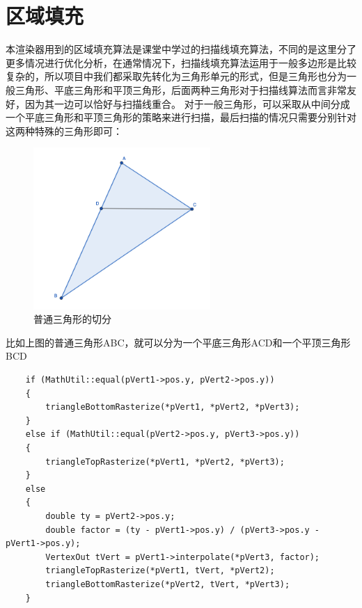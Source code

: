     \section{区域填充}
    \begin{spacing}{2.5}
    本渲染器用到的区域填充算法是课堂中学过的扫描线填充算法，不同的是这里分了更多情况进行优化分析，在通常情况下，扫描线填充算法运用于一般多边形是比较复杂的，所以项目中我们都采取先转化为三角形单元的形式，但是三角形也分为一般三角形、平底三角形和平顶三角形，后面两种三角形对于扫描线算法而言非常友好，因为其一边可以恰好与扫描线重合。
    对于一般三角形，可以采取从中间分成一个平底三角形和平顶三角形的策略来进行扫描，最后扫描的情况只需要分别针对这两种特殊的三角形即可：
	    \begin{figure}[H]
		\centering
		\includegraphics[width=0.6\textwidth]{images/scanline1.png}
		\caption{普通三角形的切分}
		\label{line}
	\end{figure}
	
比如上图的普通三角形ABC，就可以分为一个平底三角形ACD和一个平顶三角形BCD

    \end{spacing}
        \begin{lstlisting}
    if (MathUtil::equal(pVert1->pos.y, pVert2->pos.y)) 
    {
        triangleBottomRasterize(*pVert1, *pVert2, *pVert3);
    }
    else if (MathUtil::equal(pVert2->pos.y, pVert3->pos.y))
    {
        triangleTopRasterize(*pVert1, *pVert2, *pVert3);
    }
    else
    {
        double ty = pVert2->pos.y;
        double factor = (ty - pVert1->pos.y) / (pVert3->pos.y - pVert1->pos.y);
        VertexOut tVert = pVert1->interpolate(*pVert3, factor);
        triangleTopRasterize(*pVert1, tVert, *pVert2);
        triangleBottomRasterize(*pVert2, tVert, *pVert3);
    }

        \end{lstlisting}

